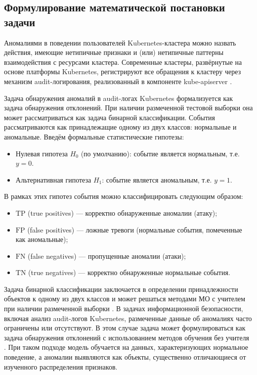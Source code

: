 \subsection{Формулирование математической постановки задачи}

Аномалиями в поведении пользователей Kubernetes-кластера можно назвать действия, имеющие нетипичные признаки и (или) нетипичные паттерны взаимодействия с ресурсами кластера. Современные кластеры, развёрнутые на основе платформы Kubernetes, регистрируют все обращения к кластеру через механизм audit-логирования, реализованный в компоненте kube-apiserver \cite{KubernetesAudit}.

Задача обнаружения аномалий в audit-логах Kubernetes формализуется как задача обнаружения отклонений. При наличии размеченной тестовой выборки она может рассматриваться как задача бинарной классификации. События рассматриваются как принадлежащие одному из двух классов: нормальные и аномальные. Введём формальные статистические гипотезы: 

\begin{itemize}
    \item Нулевая гипотеза $H_0$ (по умолчанию): событие является нормальным, т.е. $y=0$.
    \item Альтернативная гипотеза $H_1$: событие является аномальным, т.е. $y=1$.
\end{itemize}

В рамках этих гипотез события можно классифицировать следующим образом:

\begin{itemize}
  \item $\mathrm{TP}$ (true positives) --- корректно обнаруженные аномалии (атаку);
  \item $\mathrm{FP}$ (false positives) --- ложные тревоги (нормальные события, помеченные как аномальные);
  \item $\mathrm{FN}$ (false negatives) --- пропущенные аномалии (атаки);
  \item $\mathrm{TN}$ (true negatives) --- корректно обнаруженные нормальные события.
\end{itemize}

Задача бинарной классификации заключается в определении принадлежности объектов к одному из двух классов и может решаться методами МО с учителем при наличии размеченной выборки \cite{DeepLearningBook}. В задачах информационной безопасности, включая анализ audit-логов Kubernetes, размеченные данные об аномалиях часто ограничены или отсутствуют. В этом случае задача может формулироваться как задача обнаружения отклонений с использованием методов обучения без учителя \cite{AD_Survey}. При таком подходе модель обучается на данных, характеризующих нормальное поведение, а аномалии выявляются как объекты, существенно отличающиеся от изученного распределения признаков.

